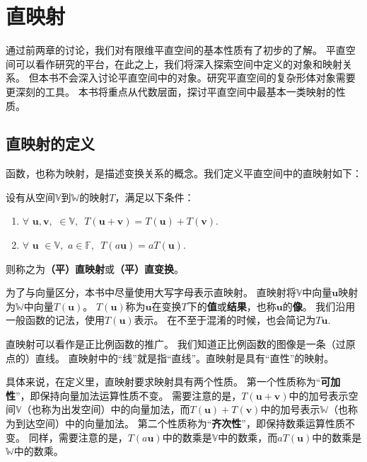 \documentclass[12pt,UTF8,fontset=none]{ctexbook}
\begin{document}
\chapter{直映射}

通过前两章的讨论，我们对有限维平直空间的基本性质有了初步的了解。
平直空间可以看作研究的平台，在此之上，我们将深入探索空间中定义的对象和映射关系。
但本书不会深入讨论平直空间中的对象。研究平直空间的复杂形体对象需要更深刻的工具。
本书将重点从代数层面，探讨平直空间中最基本一类映射的性质。

\begin{center}
\end{center}

\section{直映射的定义}
函数，也称为映射，是描述变换关系的概念。我们定义平直空间中的直映射如下：
\begin{df}\label{df:3_1}
    设有从空间$\mathbb{V}$到$\mathbb{W}$的映射$T$，满足以下条件：
    \begin{enumerate}
        \item $\forall \,\, \mathbf{u} , \mathbf{v} , \,\, \in \mathbb{V}, \,\,\, T(\mathbf{u} + \mathbf{v}) = T(\mathbf{u}) + T(\mathbf{v}). $
        \item $\forall \,\, \mathbf{u} \,\, \in \mathbb{V}, \,\, a \in \mathbb{F}, \,\,\, T(a\mathbf{u}) = aT(\mathbf{u}). $
    \end{enumerate}
    则称之为{\bfseries （平）直映射}或{\bfseries （平）直变换}。
\end{df}
为了与向量区分，本书中尽量使用大写字母表示直映射。
直映射将$\mathbb{V}$中向量$\mathbf{u}$映射为$\mathbb{W}$中向量$T(\mathbf{u})$。
$T(\mathbf{u})$称为$\mathbf{u}$在变换$T$下的\textbf{值}或\textbf{结果}，也称$\mathbf{u}$的\textbf{像}。
我们沿用一般函数的记法，使用$T(\mathbf{u})$表示。
在不至于混淆的时候，也会简记为$T\mathbf{u}$.

直映射可以看作是正比例函数的推广。
我们知道正比例函数的图像是一条（过原点的）直线。
直映射中的“线”就是指“直线”。直映射是具有“直性”的映射。

具体来说，在定义里，直映射要求映射具有两个性质。
第一个性质称为“{\bfseries 可加性}”，即保持向量加法运算性质不变。
需要注意的是，$T(\mathbf{u} + \mathbf{v})$中的加号表示空间$\mathbb{V}$（也称为出发空间）中的向量加法，而$T(\mathbf{u}) + T(\mathbf{v})$中的加号表示$\mathbb{W}$（也称为到达空间）中的向量加法。
第二个性质称为“{\bfseries 齐次性}”，即保持数乘运算性质不变。
同样，需要注意的是，$T(a\mathbf{u})$中的数乘是$\mathbb{V}$中的数乘，而$aT(\mathbf{u})$中的数乘是$\mathbb{W}$中的数乘。
\end{document}
